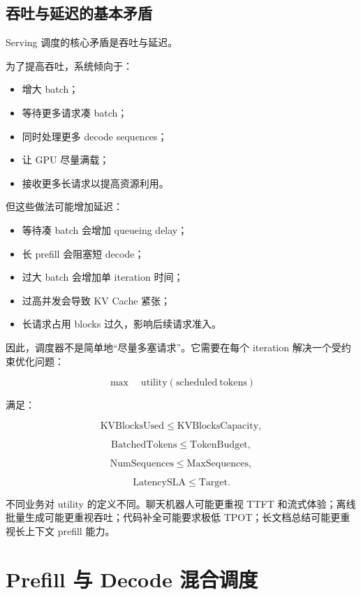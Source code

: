 \subsection{吞吐与延迟的基本矛盾}
\label{subsec:throughput-latency-tradeoff}

Serving 调度的核心矛盾是吞吐与延迟。

为了提高吞吐，系统倾向于：

\begin{itemize}
\item 增大 batch；
\item 等待更多请求凑 batch；
\item 同时处理更多 decode sequences；
\item 让 GPU 尽量满载；
\item 接收更多长请求以提高资源利用。
\end{itemize}

但这些做法可能增加延迟：

\begin{itemize}
\item 等待凑 batch 会增加 queueing delay；
\item 长 prefill 会阻塞短 decode；
\item 过大 batch 会增加单 iteration 时间；
\item 过高并发会导致 KV Cache 紧张；
\item 长请求占用 blocks 过久，影响后续请求准入。
\end{itemize}

因此，调度器不是简单地“尽量多塞请求”。它需要在每个 iteration 解决一个受约束优化问题：

\[
\max
\quad
\mathrm{utility}(\mathrm{scheduled\ tokens})
\]

满足：

\[
\mathrm{KVBlocksUsed}
\le
\mathrm{KVBlocksCapacity},
\]

\[
\mathrm{BatchedTokens}
\le
\mathrm{TokenBudget},
\]

\[
\mathrm{NumSequences}
\le
\mathrm{MaxSequences},
\]

\[
\mathrm{LatencySLA}
\le
\mathrm{Target}.
\]

不同业务对 utility 的定义不同。聊天机器人可能更重视 TTFT 和流式体验；离线批量生成可能更重视吞吐；代码补全可能要求极低 TPOT；长文档总结可能更重视长上下文 prefill 能力。

\section{Prefill 与 Decode 混合调度}
\label{sec:prefill-decode-mixed-scheduling}

